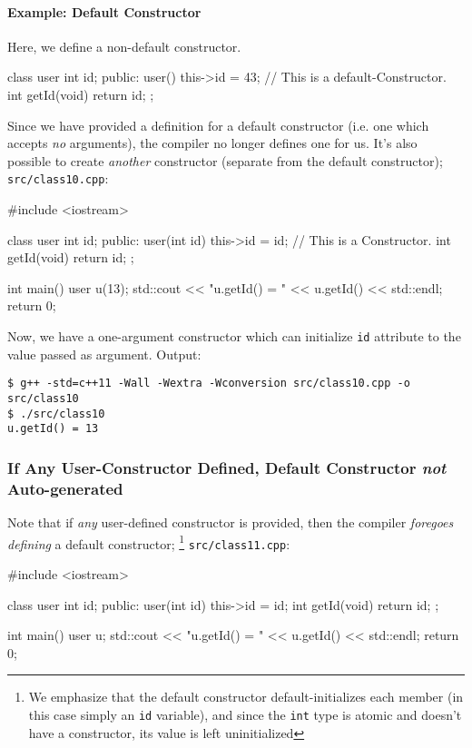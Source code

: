 \documentclass[12pt,letterpaper,twoside]{article}
\begin{document}
\paragraph{Example: Default Constructor}
Here, we define a non-default constructor.
\begin{cpp} class user {
  int id;
 public:
  user() { this->id = 43; }   // This is a default-Constructor.
  int getId(void) { return id; }
};
\end{cpp}
Since we have provided a definition for a default constructor (i.e. one which
accepts \emph{no} arguments), the compiler no longer defines one for us.
It's also possible to create \emph{another} constructor 
(separate from the default constructor);
\texttt{src/class10.cpp}:

\begin{cpp}
#include <iostream>

class user {
  int id;
 public:
  user(int id) { this->id = id; }   // This is a Constructor.
  int getId(void) { return id; }
};

int main() {
  user u(13);
  std::cout << "u.getId() = " << u.getId() << std::endl;
  return 0;
}
\end{cpp}

Now, we have a one-argument constructor which can initialize \texttt{id} 
attribute to the value passed as argument.
Output:

\begin{verbatim}
$ g++ -std=c++11 -Wall -Wextra -Wconversion src/class10.cpp -o src/class10
$ ./src/class10
u.getId() = 13
\end{verbatim}

\subsubsection{If Any User-Constructor Defined, Default Constructor \emph{not} Auto-generated}
Note that if \emph{any} user-defined constructor is provided, then the compiler \emph{foregoes defining} a default constructor; \footnote{We emphasize that 
the default constructor default-initializes each 
member (in this case simply an \texttt{id} variable), and since the 
\texttt{int} type is atomic and doesn't have a constructor, its value is 
left uninitialized}
\texttt{src/class11.cpp}:

\begin{cpp}
#include <iostream>

class user {
  int id;
 public:
  user(int id) { this->id = id; }
  int getId(void) { return id; }
};

int main() {
  user u;
  std::cout << "u.getId() = " << u.getId() << std::endl;
  return 0;
}
\end{cpp}
\end{document}
